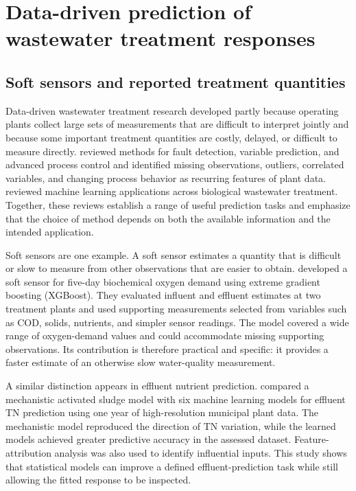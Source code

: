 \section{Data-driven prediction of wastewater treatment responses}

\subsection{Soft sensors and reported treatment quantities}

Data-driven wastewater treatment research developed partly because operating plants collect large sets of measurements that are difficult to interpret jointly and because some important treatment quantities are costly, delayed, or difficult to measure directly. \citet{Newhart2019} reviewed methods for fault detection, variable prediction, and advanced process control and identified missing observations, outliers, correlated variables, and changing process behavior as recurring features of plant data. \citet{Sundui2021} reviewed machine learning applications across biological wastewater treatment. Together, these reviews establish a range of useful prediction tasks and emphasize that the choice of method depends on both the available information and the intended application.

Soft sensors are one example. A soft sensor estimates a quantity that is difficult or slow to measure from other observations that are easier to obtain. \citet{Ching2022} developed a soft sensor for five-day biochemical oxygen demand using extreme gradient boosting (XGBoost). They evaluated influent and effluent estimates at two treatment plants and used supporting measurements selected from variables such as COD, solids, nutrients, and simpler sensor readings. The model covered a wide range of oxygen-demand values and could accommodate missing supporting observations. Its contribution is therefore practical and specific: it provides a faster estimate of an otherwise slow water-quality measurement.

A similar distinction appears in effluent nutrient prediction. \citet{Wang2025} compared a mechanistic activated sludge model with six machine learning models for effluent TN prediction using one year of high-resolution municipal plant data. The mechanistic model reproduced the direction of TN variation, while the learned models achieved greater predictive accuracy in the assessed dataset. Feature-attribution analysis was also used to identify influential inputs. This study shows that statistical models can improve a defined effluent-prediction task while still allowing the fitted response to be inspected.


